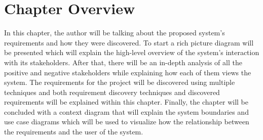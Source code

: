 \section{Chapter Overview}

In this chapter, the author will be talking about the proposed system's requirements and how they were discovered. To start a rich picture diagram will be presented which will explain the high-level overview of the system's interaction with its stakeholders. After that, there will be an in-depth analysis of all the positive and negative stakeholders while explaining how each of them views the system. The requirements for the project will be discovered using multiple techniques and both requirement discovery techniques and discovered requirements will be explained within this chapter. Finally, the chapter will be concluded with a context diagram that will explain the system boundaries and use case diagrams which will be used to visualize how the relationship between the requirements and the user of the system. 